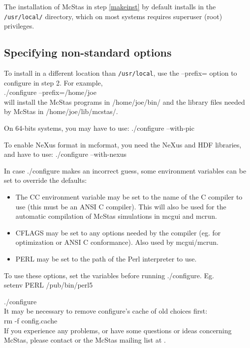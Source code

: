 \noindent The installation of McStas in step \ref{makeinst} by default installs in the
\texttt{/usr/local/} directory, which on most systems requires superuser (root)
privileges.

\subsection{Specifying non-standard options}
To install in a different location than \texttt{/usr/local}, use the --prefix= option to
configure in step 2. For example,\\

  ./configure --prefix=/home/joe\\

\noindent will install the McStas programs in /home/joe/bin/ and the
library files needed by McStas in /home/joe/lib/mcstas/.

\noindent On 64-bits systems, you may have to use: ./configure --with-pic

\noindent To enable NeXus format in mcformat, you need the NeXus and HDF libraries, and have to use: ./configure --with-nexus

In case ./configure makes an incorrect guess, some environment variables
can be set to override the defaults:
\begin{itemize}
\item{The CC environment variable may be set to the name of the C compiler
   to use (this must be an ANSI C compiler). This will also be used for
   the automatic compilation of McStas simulations in mcgui and
   mcrun.}
\item{CFLAGS may be set to any options needed by the compiler (eg. for
   optimization or ANSI C conformance). Also used by mcgui/mcrun.}
\item{PERL may be set to the path of the Perl interpreter to use.}
\end{itemize}
\noindent To use these options, set the variables before running ./configure. Eg.\\

    setenv PERL /pub/bin/perl5

    ./configure\\

\noindent It may be necessary to remove configure's cache of old
choices first:\\


    rm -f config.cache\\


\noindent If you experience any problems, or have some questions or ideas
concerning McStas, please contact
or the McStas mailing list at .

